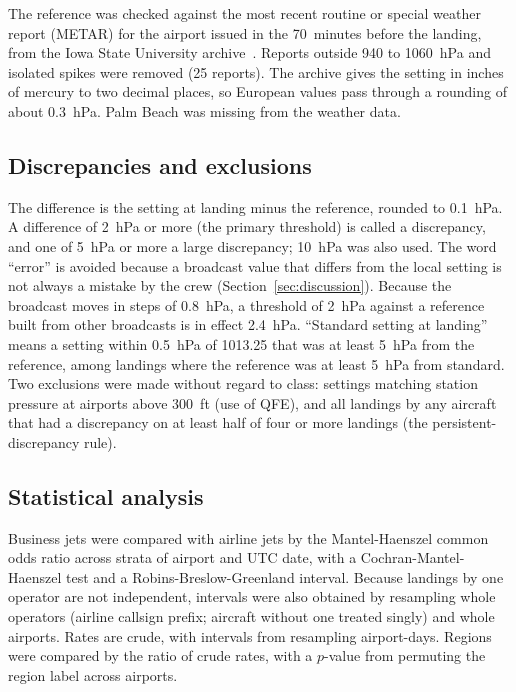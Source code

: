 \documentclass[11pt]{article}
\begin{document}
The reference was checked against the most recent routine or special weather report (METAR) for the airport issued in the 70~minutes before the landing, from the Iowa State University archive~\cite{iem}. Reports outside 940 to 1060~hPa and isolated spikes were removed (25 reports). The archive gives the setting in inches of mercury to two decimal places, so European values pass through a rounding of about 0.3~hPa. Palm Beach was missing from the weather data.

\subsection{Discrepancies and exclusions}

The difference is the setting at landing minus the reference, rounded to 0.1~hPa. A difference of 2~hPa or more (the primary threshold) is called a discrepancy, and one of 5~hPa or more a large discrepancy; 10~hPa was also used. The word ``error'' is avoided because a broadcast value that differs from the local setting is not always a mistake by the crew (Section~\ref{sec:discussion}). Because the broadcast moves in steps of 0.8~hPa, a threshold of 2~hPa against a reference built from other broadcasts is in effect 2.4~hPa. ``Standard setting at landing'' means a setting within 0.5~hPa of 1013.25 that was at least 5~hPa from the reference, among landings where the reference was at least 5~hPa from standard. Two exclusions were made without regard to class: settings matching station pressure at airports above 300~ft (use of QFE), and all landings by any aircraft that had a discrepancy on at least half of four or more landings (the persistent-discrepancy rule).

\subsection{Statistical analysis}

Business jets were compared with airline jets by the Mantel-Haenszel common odds ratio across strata of airport and UTC date, with a Cochran-Mantel-Haenszel test and a Robins-Breslow-Greenland interval. Because landings by one operator are not independent, intervals were also obtained by resampling whole operators (airline callsign prefix; aircraft without one treated singly) and whole airports. Rates are crude, with intervals from resampling airport-days. Regions were compared by the ratio of crude rates, with a $p$-value from permuting the region label across airports.
\end{document}
